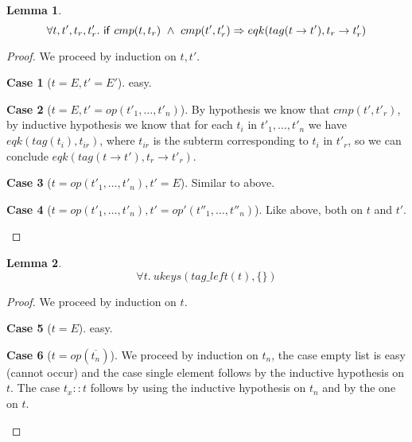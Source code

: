 \documentclass{article}[12pt,a4paper]
\theoremstyle{definition}
\newtheorem{case}{Case}
\newtheorem{lemma}{Lemma}
\begin{document}
\begin{lemma}
  \[
    \forall t,t',t_r,t'_r.~\mathsf{if}~cmp(t,t_r)~\wedge~
    cmp(t',t'_r) \Rightarrow eqk(tag(t\rightarrow t'),t_r\rightarrow t'_r)
  \]
\end{lemma}
\begin{proof}
  We proceed by induction on $t,t'$.\\
  \begin{case}[$t=E,t'=E'$]
    easy.
  \end{case}
  \begin{case}[$t=E,t'=op(t'_1,\ldots,t'_n)$]
    By hypothesis we know that $cmp(t',t'_r)$, by inductive hypothesis we
    know that for each $t_i$ in $t'_1,\ldots,t'_n$ we have 
    $eqk(tag(t_i), t_{ir})$, where $t_{ir}$ is the subterm corresponding to
    $t_i$ in $t'_r$, so we can conclude
    $eqk(tag(t\rightarrow t'), t_r\rightarrow t'_r)$.
  \end{case}
  \begin{case}[$t=op(t'_1,\ldots,t'_n),t'=E$]
    Similar to above.
  \end{case}
  \begin{case}[$t=op(t'_1,\ldots,t'_n),t'=op'(t''_1,\ldots,t''_n)$]
    Like above, both on $t$ and $t'$.
  \end{case}
\end{proof}

\begin{lemma}
  \[
    \forall t.~ ukeys(tag\_left(t),\{\})
  \]
\end{lemma}
\begin{proof}
  We proceed by induction on $t$.\\
  \begin{case}[$t=E$]
    easy.
  \end{case}
  \begin{case}[$t=op(\overline{t_n})$]
    We proceed by induction on $t_n$, the case empty list is easy (cannot
    occur) and the case single element follows by the inductive hypothesis on $t$.
    The case $t_x::t$ follows by using the inductive hypothesis on $t_n$ and by
    the one on $t$.
    
  \end{case}
\end{proof}
\end{document}
